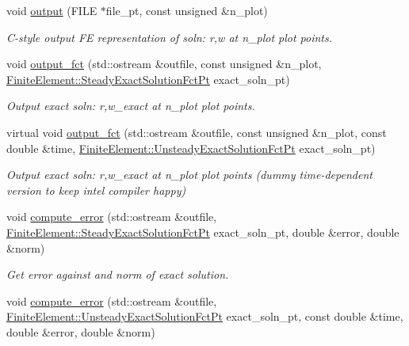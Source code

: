 \begin{DoxyCompactItemize}
void \hyperlink{classoomph_1_1AxisymFoepplvonKarmanEquations_a5278f37c336b7a4bd2931fdedd2945f8}{output} (F\+I\+LE $\ast$file\+\_\+pt, const unsigned \&n\+\_\+plot)
\begin{DoxyCompactList}\small\item\em C-\/style output FE representation of soln\+: r,w at n\+\_\+plot plot points. \end{DoxyCompactList}\item 
void \hyperlink{classoomph_1_1AxisymFoepplvonKarmanEquations_aae7ed0c9ae0e1a1e2656534807a24527}{output\+\_\+fct} (std\+::ostream \&outfile, const unsigned \&n\+\_\+plot, \hyperlink{classoomph_1_1FiniteElement_a690fd33af26cc3e84f39bba6d5a85202}{Finite\+Element\+::\+Steady\+Exact\+Solution\+Fct\+Pt} exact\+\_\+soln\+\_\+pt)
\begin{DoxyCompactList}\small\item\em Output exact soln\+: r,w\+\_\+exact at n\+\_\+plot plot points. \end{DoxyCompactList}\item 
virtual void \hyperlink{classoomph_1_1AxisymFoepplvonKarmanEquations_a14d84273c5e7a3cdec8fb9b228d675c3}{output\+\_\+fct} (std\+::ostream \&outfile, const unsigned \&n\+\_\+plot, const double \&time, \hyperlink{classoomph_1_1FiniteElement_ad4ecf2b61b158a4b4d351a60d23c633e}{Finite\+Element\+::\+Unsteady\+Exact\+Solution\+Fct\+Pt} exact\+\_\+soln\+\_\+pt)
\begin{DoxyCompactList}\small\item\em Output exact soln\+: r,w\+\_\+exact at n\+\_\+plot plot points (dummy time-\/dependent version to keep intel compiler happy) \end{DoxyCompactList}\item 
void \hyperlink{classoomph_1_1AxisymFoepplvonKarmanEquations_abbcf5312db19fdbe66f5dab3bbe9bfda}{compute\+\_\+error} (std\+::ostream \&outfile, \hyperlink{classoomph_1_1FiniteElement_a690fd33af26cc3e84f39bba6d5a85202}{Finite\+Element\+::\+Steady\+Exact\+Solution\+Fct\+Pt} exact\+\_\+soln\+\_\+pt, double \&error, double \&norm)
\begin{DoxyCompactList}\small\item\em Get error against and norm of exact solution. \end{DoxyCompactList}\item 
void \hyperlink{classoomph_1_1AxisymFoepplvonKarmanEquations_a239536a30ed45a68f678037b9bdc7c9b}{compute\+\_\+error} (std\+::ostream \&outfile, \hyperlink{classoomph_1_1FiniteElement_ad4ecf2b61b158a4b4d351a60d23c633e}{Finite\+Element\+::\+Unsteady\+Exact\+Solution\+Fct\+Pt} exact\+\_\+soln\+\_\+pt, const double \&time, double \&error, double \&norm)

\end{DoxyCompactItemize}
